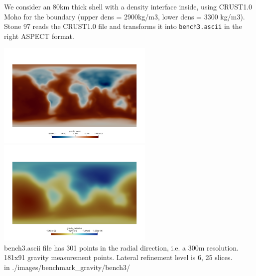 We consider an 80km thick shell with a density interface inside, using CRUST1.0 Moho 
for the boundary (upper dens = 2900kg/m3, lower dens = 3300 kg/m3).
Stone 97 reads the CRUST1.0 file and transforms it into {\tt bench3.ascii} in the 
right ASPECT format.  


\begin{center}
\includegraphics[width=7.5cm]{./images/benchmark_gravity/bench3/g}
\includegraphics[width=7.5cm]{./images/benchmark_gravity/bench3/U}\\
{\captionfont bench3.ascii file has 301 points in the radial direction, i.e. a 
300m resolution. 181x91 gravity measurement points. Lateral refinement level is 6, 25 slices.\\
{\tiny {\color{gray} in ./images/benchmark\_gravity/bench3/}}
}
\end{center}





